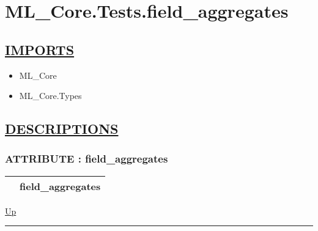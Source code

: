 \chapter*{ML\_Core.Tests.field\_aggregates}
\hypertarget{ecldoc:toc:ML_Core.Tests.field_aggregates}{}

\section*{\underline{IMPORTS}}
\begin{itemize}
\item ML\_Core
\item ML\_Core.Types
\end{itemize}

\section*{\underline{DESCRIPTIONS}}
\subsection*{ATTRIBUTE : field\_aggregates}
\hypertarget{ecldoc:ml_core.tests.field_aggregates}{}

{\renewcommand{\arraystretch}{1.5}
\begin{tabularx}{\textwidth}{|>{\raggedright\arraybackslash}l|X|}
\hline
\hspace{0pt} & field\_aggregates \\
\hline
\end{tabularx}
}

\hyperlink{ecldoc:toc:ML_Core/Tests}{Up}

\par


\rule{\textwidth}{0.4pt}
